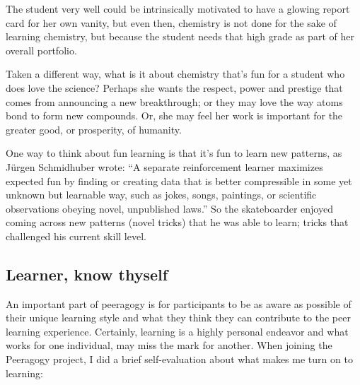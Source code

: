 The student very well could be intrinsically motivated to have a glowing
report card for her own vanity, but even then, chemistry is not done for
the sake of learning chemistry, but because the student needs that high
grade as part of her overall portfolio.

Taken a different way, what is it about chemistry that's fun for a
student who does love the science? Perhaps she wants the respect, power
and prestige that comes from announcing a new breakthrough; or they may
love the way atoms bond to form new compounds. Or, she may feel her work
is important for the greater good, or prosperity, of humanity.

One way to think about fun learning is that it's fun to learn new
patterns, as Jürgen Schmidhuber wrote: ``A separate reinforcement
learner maximizes expected fun by finding or creating data that is
better compressible in some yet unknown but learnable way, such as
jokes, songs, paintings, or scientific observations obeying novel,
unpublished laws.'' So the skateboarder enjoyed coming across new
patterns (novel tricks) that he was able to learn; tricks that
challenged his current skill level.

\subsection{Learner, know thyself}

An important part of peeragogy is for participants to be as aware as
possible of their unique learning style and what they think they can
contribute to the peer learning experience. Certainly, learning is a
highly personal endeavor and what works for one individual, may miss the
mark for another. When joining the Peeragogy project, I did a brief
self-evaluation about what makes me turn on to learning:

